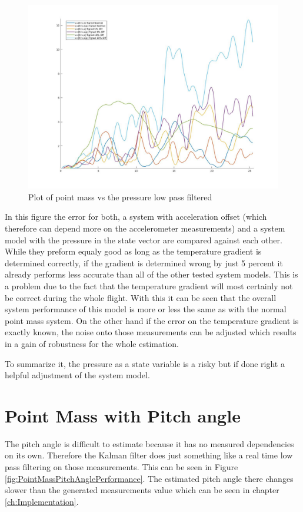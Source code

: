 \begin{figure}[h!]
 \centering
 \includegraphics[width=.8 \textwidth]{./Pictures/PointMassVSPressure.jpg}
 \caption{Plot of point mass vs the pressure low pass filtered}
 \label{fig:PointMassVSPressure}
\end{figure}

In this figure the error for both, a system with acceleration offset (which therefore can depend more on the accelerometer measurements)
and a system model with the pressure in the state vector are compared against each other.
While they preform equaly good as long as the temperature gradient is determined correctly,
if the gradient is determined wrong by just 5 percent it already performs less accurate than all of the other tested system models.
This is a problem due to the fact that the temperature gradient will most certainly not be correct during the whole flight.
With this it can be seen that the overall system performance of this model is more or less the same as with the normal point mass system.
On the other hand if the error on the temperature gradient is exactly known, the noise onto those measurements can be adjusted which
results in a gain of robustness for the whole estimation.

To summarize it, the pressure as a state variable is a risky but if done right a helpful adjustment of the system model.

\newpage
\section{Point Mass with Pitch angle}
The pitch angle is difficult to estimate because it has no measured dependencies on its own.
Therefore the Kalman filter does just something like a real time low pass filtering on those measurements.
This can be seen in Figure \ref{fig:PointMassPitchAnglePerformance}. The estimated pitch angle there changes slower than the generated measurements value which can be seen in chapter \ref{ch:Implementation}.

